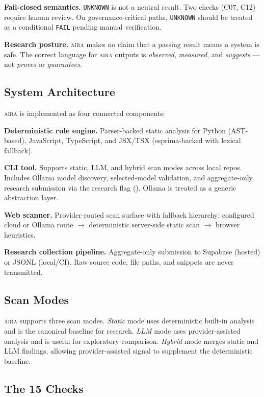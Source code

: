 \documentclass[11pt]{article}
\newcommand{\aira}{\textsc{aira}}
\begin{document}
\textbf{Fail-closed semantics.} \texttt{UNKNOWN} is not a neutral result. Two checks (C07,
C12) require human review. On governance-critical paths, \texttt{UNKNOWN} should be treated
as a conditional \texttt{FAIL} pending manual verification.

\textbf{Research posture.} \aira{} makes no claim that a passing result means a system is
safe. The correct language for \aira{} outputs is \emph{observed}, \emph{measured}, and
\emph{suggests} --- not \emph{proves} or \emph{guarantees}.

\subsection{System Architecture}

\aira{} is implemented as four connected components:

\textbf{Deterministic rule engine.} Parser-backed static analysis for Python (AST-based),
JavaScript, TypeScript, and JSX/TSX (esprima-backed with lexical fallback).

\textbf{CLI tool.} Supports static, LLM, and hybrid scan modes across local repos. Includes
Ollama model discovery, selected-model validation, and aggregate-only research submission
via the research flag (). Ollama is treated as a generic
abstraction layer.

\textbf{Web scanner.} Provider-routed scan surface with fallback hierarchy: configured cloud
or Ollama route $\to$ deterministic server-side static scan $\to$ browser heuristics.

\textbf{Research collection pipeline.} Aggregate-only submission to Supabase (hosted) or
JSONL (local/CI). Raw source code, file paths, and snippets are never transmitted.

\subsection{Scan Modes}

\aira{} supports three scan modes. \emph{Static} mode uses deterministic built-in analysis
and is the canonical baseline for research. \emph{LLM} mode uses provider-assisted analysis
and is useful for exploratory comparison. \emph{Hybrid} mode merges static and LLM findings,
allowing provider-assisted signal to supplement the deterministic baseline.

\subsection{The 15 Checks}
\label{sec:checks}
\end{document}
